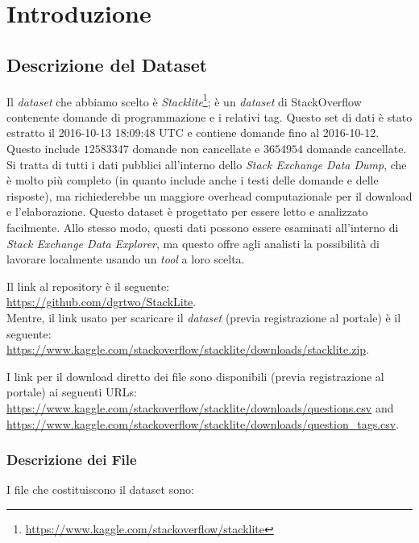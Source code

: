 \documentclass[10pt]{article}
\begin{document}
\section{Introduzione}

\subsection{Descrizione del Dataset}

Il \textit{dataset} che abbiamo scelto è \textit{Stacklite}\footnote{\url{https://www.kaggle.com/stackoverflow/stacklite}}; è un \textit{dataset} di StackOverflow contenente domande di programmazione e i relativi tag.
Questo set di dati è stato estratto il 2016-10-13 18:09:48 UTC e contiene domande fino al 2016-10-12. Questo include $12583347$ domande non cancellate e $3654954$ domande cancellate.
Si tratta di tutti i dati pubblici all'interno dello \textit{Stack Exchange Data Dump}, che è molto più completo (in quanto include anche i testi delle domande e delle risposte), ma richiederebbe un maggiore overhead computazionale per il download e l'elaborazione.
Questo dataset è progettato per essere letto e analizzato facilmente. Allo stesso modo, questi dati possono essere esaminati all'interno di \textit{Stack Exchange Data Explorer}, ma questo offre agli analisti la possibilità di lavorare localmente usando un \textit{tool} a loro scelta.

Il link al repository è il seguente:\\
\url{https://github.com/dgrtwo/StackLite}.\\
Mentre, il link usato per scaricare il \textit{dataset} (previa registrazione al portale) è il seguente: 
\url{https://www.kaggle.com/stackoverflow/stacklite/downloads/stacklite.zip}.

I link per il download diretto dei file sono disponibili (previa registrazione al portale) ai seguenti URLs: \url{https://www.kaggle.com/stackoverflow/stacklite/downloads/questions.csv} and \url{https://www.kaggle.com/stackoverflow/stacklite/downloads/question\_tags.csv}.

\subsubsection{Descrizione dei File}

I file che costituiscono il dataset sono:
\end{document}
